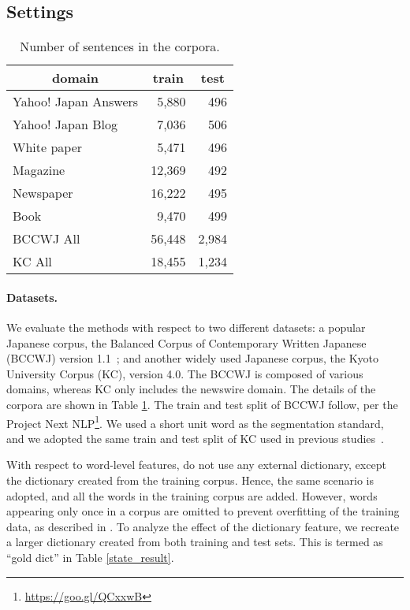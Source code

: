 \documentclass[11pt]{article}
\begin{document}
\subsection{Settings}
\begin{table}[t]
\caption{Number of sentences in the corpora.}
\label{bccwj}
\centering
\begin{tabular}{p{45mm}rr}
  \toprule
  \multicolumn{1}{c}{domain} & \multicolumn{1}{c}{train} &\multicolumn{1}{c}{test} \\
  \midrule
  Yahoo! Japan Answers  & 5,880 & 496 \\    
  Yahoo! Japan Blog     & 7,036 & 506 \\
  White paper           & 5,471 & 496 \\
  Magazine              &12,369 & 492 \\   
  Newspaper             &16,222 & 495 \\
  Book                  & 9,470 & 499 \\
  BCCWJ All             &56,448 &2,984\\
  \midrule
  KC All                &18,455 &1,234\\
  \bottomrule
\end{tabular}
\end{table}  

\paragraph{Datasets.}
We evaluate the methods with respect to two different datasets: a
popular Japanese corpus, the Balanced Corpus of Contemporary Written
Japanese (BCCWJ) version 1.1~\cite{maekawa2014balanced};
and another widely used Japanese corpus, the Kyoto University Corpus (KC),
version 4.0.
The BCCWJ is composed of various domains, whereas KC only includes the
newswire domain. The details of the corpora are shown in Table \ref{bccwj}.
The train and test split of BCCWJ follow, per the Project Next
NLP\footnote{\url{https://goo.gl/QCxxwB}}. We used a short unit word as
the segmentation standard, and we adopted the same train and test split of KC used in previous
studies~\cite{kudo-yamamoto-matsumoto:2004:EMNLP,uchimoto2001unknown}.

With respect to word-level features,
 do not use any external
dictionary, except the dictionary created from the training corpus. Hence, the
same scenario is adopted, and all the words in the training corpus are added.
However, words appearing only once in a corpus are omitted to prevent
overfitting of the training data, as
described in \cite{neubig-nakata-mori:2011:ACL-HLT2011}.
To analyze the effect of the dictionary feature, we recreate a larger
dictionary created from both training and test sets. This is termed as ``gold
dict'' in Table \ref{state_result}.
\end{document}
